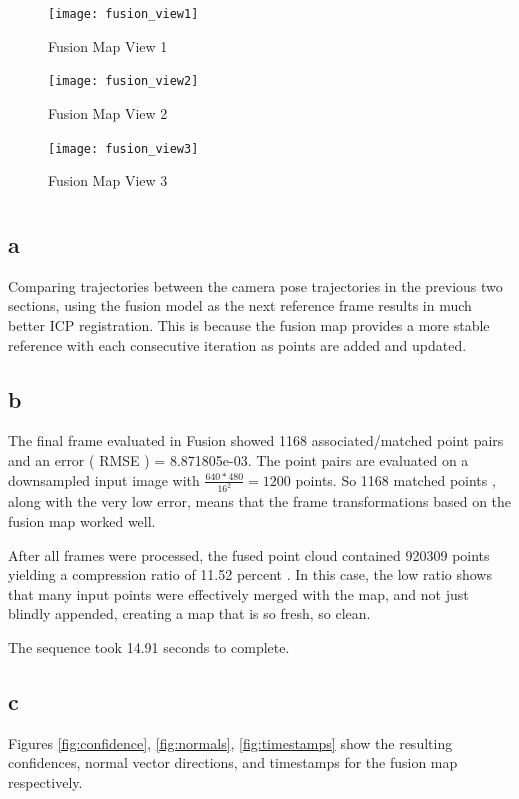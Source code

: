 \documentclass[12pt]{article}
\begin{document}
\begin{figure}[H]
\centering
\texttt{[image: fusion\_view1]}
\caption{ Fusion Map View 1 } 
\label{fig:fusion1}
\end{figure}   

\begin{figure}[H]
\centering
\texttt{[image: fusion\_view2]}
\caption{ Fusion Map View 2 } 
\label{fig:fusion2}
\end{figure}   

\begin{figure}[H]
\centering
\texttt{[image: fusion\_view3]}
\caption{ Fusion Map View 3 } 
\label{fig:fusion3}
\end{figure}   

\section{}
\subsection{a}
Comparing trajectories between the camera pose trajectories in the previous two sections, using the fusion model as the next reference frame results in much better ICP registration. This is because the fusion map provides a more stable reference with each consecutive iteration as points are added and updated.

\subsection{b}
The final frame evaluated in Fusion showed 1168 associated/matched point pairs and an error ( RMSE ) = 8.871805e-03.  
The point pairs are evaluated on a downsampled input image with $\frac{  640 * 480 } { 16^{2} } = 1200$ points. So 1168 matched points , along with the very low error, means that the frame transformations based on the fusion map worked well.
  
After all frames were processed, the fused point cloud contained 920309 points yielding a compression ratio of 11.52 percent . In this case, the low ratio shows that many input points were effectively merged with the map, and not just blindly appended, creating a map that is so fresh, so clean.
  
The sequence took 14.91 seconds to complete.  

\subsection{c}
Figures \ref{fig:confidence}, \ref{fig:normals}, \ref{fig:timestamps} show the resulting confidences, normal vector directions, and timestamps for the fusion map respectively.
\end{document}
